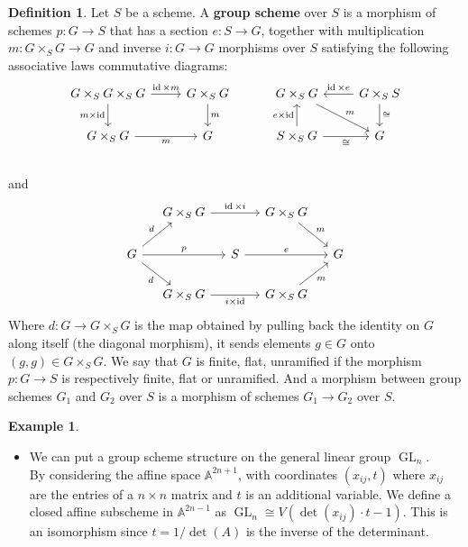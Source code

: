 \documentclass{article}
\theoremstyle{plain}
\theoremstyle{definition}
\newtheorem{definition}[theorem]{Definition}
\newtheorem{example}[theorem]{Example}
\DeclareMathOperator{\GL}{GL}
\DeclareMathOperator{\id}{id}
\begin{document}
\begin{definition}
\label{group_scheme_def_1}
    Let $S$ be a scheme. A \textbf{group scheme} over $S$ is a morphism of schemes $p:G\rightarrow S$ that has a section $e:S\rightarrow G$,
    together with multiplication $m:G\times_SG\rightarrow G$ and inverse $i:G\rightarrow G$ morphisms over $S$ satisfying the following associative laws commutative diagrams: 
    \[
    \begin{tikzcd}
        G\times_S G \times_S G \arrow[r,"\id\times m"] \arrow[d, "m\times \id"'] & G\times_S G \arrow[d,"m"] \\
        G\times_S G \arrow[r,"m"'] &  G
    \end{tikzcd}
    \hspace{1cm}
    \begin{tikzcd}
        G\times_S G \arrow[dr, "m"]  & G\times_S S \arrow[l,"\id\times e"'] \arrow[d,"\cong"] \\
        S\times_S G \arrow[u,"e\times\id"] \arrow[r,"\cong"'] &  G
    \end{tikzcd}
    \]
    \\
    and
    \[
    \begin{tikzcd}[column sep=small]
        & G\times_S G \arrow[rr, "\id\times i"] && G\times_S G \arrow[dr,"m"] \\
        G\arrow[rr, "p"] \arrow[ur,"d"] \arrow[dr,"d"'] && S \arrow[rr,"e"] && G\\
        & G\times_S G \arrow[rr,"i\times\id"'] &&  G\times_S G \arrow[ur,"m"']
    \end{tikzcd}
    \]
    Where $d:G\rightarrow G\times_SG$ is the map obtained by pulling back the identity on $G$ along itself (the diagonal morphism), it sends elements $g\in G$ onto $(g,g) \in G\times_S G$.
    We say that $G$ is finite, flat, unramified if the morphism $p:G\rightarrow S$ is respectively finite, flat or unramified. And a morphism between group schemes $G_1$ and $G_2$ over $S$ is a morphism of schemes $G_1\rightarrow G_2$ over $S$.
\end{definition}

\begin{example}\textbf{ }
\begin{itemize}
    \item[$a)$] We can put a group scheme structure on the general linear group $\GL_n$. \\
    By considering the affine space $\mathbb{A}^{2n+1}$, with coordinates $(x_{ij},t)$ where $x_{ij}$ are the entries of a $n\times n$ matrix and $t$ is an additional variable.
    We define a closed affine subscheme in $\mathbb{A}^{2n-1}$ as $\GL_n \cong V(\det(x_{ij})\cdot t -1)$.
    This is an isomorphism since $t=1/\det(A)$ is the inverse of the determinant.
\end{itemize}
    
\end{example}
\end{document}

